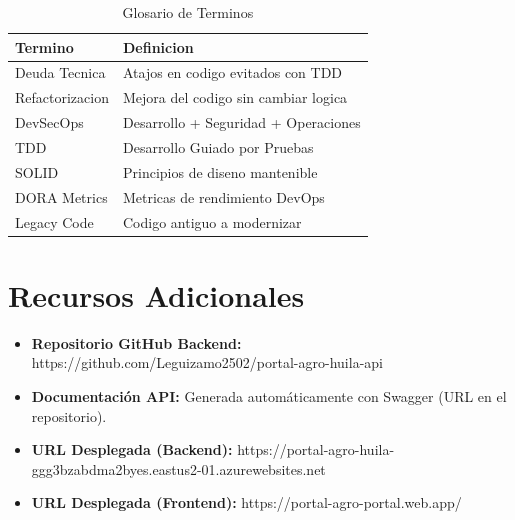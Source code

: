 \begin{table}[htbp]
\centering
\small
\begin{tabular}{|p{2.5cm}|p{5cm}|}
\hline
\textbf{Termino} & \textbf{Definicion} \\
\hline
Deuda Tecnica & Atajos en codigo evitados con TDD \\
\hline
Refactorizacion & Mejora del codigo sin cambiar logica \\
\hline
DevSecOps & Desarrollo + Seguridad + Operaciones \\
\hline
TDD & Desarrollo Guiado por Pruebas \\
\hline
SOLID & Principios de diseno mantenible \\
\hline
DORA Metrics & Metricas de rendimiento DevOps \\
\hline
Legacy Code & Codigo antiguo a modernizar \\
\hline
\end{tabular}
\caption{Glosario de Terminos}
\end{table}

\section{Recursos Adicionales}

\begin{itemize}
\item \textbf{Repositorio GitHub Backend:} https://github.com/Leguizamo2502/portal-agro-huila-api
\item \textbf{Documentación API:} Generada automáticamente con Swagger (URL en el repositorio).
\item \textbf{URL Desplegada (Backend):} https://portal-agro-huila-ggg3bzabdma2byes.eastus2-01.azurewebsites.net
\item \textbf{URL Desplegada (Frontend):} https://portal-agro-portal.web.app/
\end{itemize}